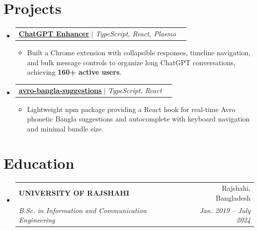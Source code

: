\documentclass[letterpaper,11pt]{article}
\makeatletter
\newcommand{\resumeItem}[1]{
  \item\small{
    {#1 \vspace{-2pt}}
  }
}
\newcommand{\resumeSubheading}[4]{
  \vspace{-2pt}\item
    \begin{tabular*}{0.97\textwidth}[t]{l@{\extracolsep{\fill}}r}
      \textbf{#1} & #2 \\
      \textit{\small#3} & \textit{\small #4} \\
    \end{tabular*}\vspace{-7pt}
}
\newcommand{\resumeProjectHeading}[1]{
    \item
    \begin{tabular*}{0.97\textwidth}{l@{\extracolsep{\fill}}r}
      \small#1 \\
    \end{tabular*}\vspace{-7pt}
}
\newcommand{\resumeSubHeadingListStart}{\begin{itemize}[leftmargin=0in, label={}]}
\newcommand{\resumeSubHeadingListEnd}{\end{itemize}}
\newcommand{\resumeItemListStart}{\begin{itemize}[leftmargin=0.05in, label={}]}
\newcommand{\resumeItemListEnd}{\end{itemize}\vspace{-5pt}}
\makeatother
\begin{document}
\section{Projects}
    \resumeSubHeadingListStart
      \resumeProjectHeading
        {\textbf{\href{https://chromewebstore.google.com/detail/chatgpt-enhancer/hbippgjekfemnkhnnmlblbildgdfafoe}{\uline{ChatGPT Enhancer}}} $|$ \emph{TypeScript, React, Plasmo}}
        \resumeItemListStart
          \resumeItem{Built a Chrome extension with collapsible responses, timeline navigation, and bulk message controls to organize long ChatGPT conversations, achieving \textbf{160+ active users}.}
        \resumeItemListEnd
        \resumeProjectHeading
          {\textbf{\href{https://www.npmjs.com/package/avro-bangla-suggestions}{\uline{avro-bangla-suggestions}}} $|$ \emph{TypeScript, React}}
        \resumeItemListStart
          \resumeItem{Lightweight npm package providing a React hook for real-time Avro phonetic Bangla suggestions and autocomplete with keyboard navigation and minimal bundle size.}
        \resumeItemListEnd
    \resumeSubHeadingListEnd



\section{Education}
  \resumeSubHeadingListStart
    \resumeSubheading
      {UNIVERSITY OF RAJSHAHI}{Rajshahi, Bangladesh}
      { B.Sc. in Information and Communication Engineering}{Jan. 2019 -- July 2024}
  \resumeSubHeadingListEnd



\end{document}
